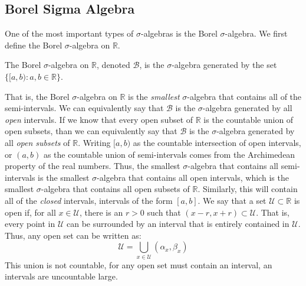 \documentclass[crop=false,class=book,oneside]{standalone}
\begin{document}
        \subsection{Borel Sigma Algebra}
            One of the most important types of $\sigma$-algebras
            is the Borel $\sigma$-algebra. We first define the
            Borel $\sigma$-algebra on $\mathbb{R}$.
            \begin{definition}
                The Borel $\sigma$-algebra on $\mathbb{R}$, denoted
                $\mathcal{B}$, is the $\sigma$-algebra generated
                by the set $\{[a,b):a,b\in\mathbb{R}\}$.
            \end{definition}
            That is, the Borel $\sigma$-algebra on $\mathbb{R}$ is
            the \textit{smallest} $\sigma$-algebra that contains
            all of the semi-intervals. We can equivalently say that
            $\mathcal{B}$ is the $\sigma$-algebra generated by all
            \textit{open} intervals. If we know that every open
            subset of $\mathbb{R}$ is the countable union of open
            subsets, than we can equivalently say that
            $\mathcal{B}$ is the $\sigma$-algebra generated by all
            \textit{open subsets} of $\mathbb{R}$. Writing $[a,b)$
            as the countable intersection of open intervals, or
            $(a,b)$ as the countable union of semi-intervals comes
            from the Archimedean property of the real numbers.
            Thus, the smallest $\sigma$-algebra that contains all
            semi-intervals is the smallest $\sigma$-algebra that
            contains all open intervals, which
            is the smallest $\sigma$-algebra that contains all open
            subsets of $\mathbb{R}$. Similarly, this will contain all
            of the \textit{closed} intervals, intervals of the form
            $[a,b]$. We say that a set $\mathcal{U}\subset\mathbb{R}$
            is open if, for all $x\in\mathcal{U}$, there is an $r>0$
            such that $(x-r,x+r)\subset\mathcal{U}$. That is, every
            point in $\mathcal{U}$ can be surrounded by an interval
            that is entirely contained in $\mathcal{U}$. Thus, any
            open set can be written as:
            \begin{equation}
                \mathcal{U}=
                    \bigcup_{x\in\mathcal{U}}(\alpha_{x},\beta_{x})
            \end{equation}
            This union is not countable, for any open set must
            contain an interval, an intervals are uncountable large.
\end{document}
